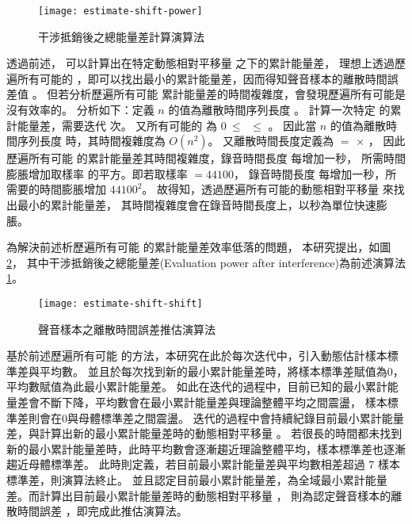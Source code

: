 \begin{figure}[H]
    \centering
    \texttt{[image: estimate-shift-power]}
    \caption{干涉抵銷後之總能量差計算演算法}\label{fig:estimate-power}
\end{figure}

    透過前述，
可以計算出在特定動態相對平移量 \DEFcandiSFT 之下的累計能量差，
理想上透過歷遍所有可能的 \DEFcandiSFT，即可以找出最小的累計能量差，因而得知聲音樣本的離散時間誤差值 \DEFshift。
但若分析歷遍所有可能 \DEFcandiSFT 累計能量差的時間複雜度，會發現歷遍所有可能是沒有效率的。
分析如下：定義 $n$ 的值為離散時間序列長度 \DEFtimeLen。
計算一次特定 \DEFcandiSFT 的累計能量差，需要迭代 \DEFtimeLen 次。
又所有可能的 \DEFcandiSFT 為 $0 ~\leq$ \DEFcandiSFT $~\leq$ \DEFtimeLen。
因此當 $n$ 的值為離散時間序列長度 \DEFtimeLen 時，其時間複雜度為 $O(n^2)$。
又離散時間長度定義為 \DEFtimeLen $=$ \DEFsamplerate $\times$ \DEFtimeREC，
因此歷遍所有可能 \DEFcandiSFT 的累計能量差其時間複雜度，錄音時間長度 \DEFtimeREC 每增加一秒，
所需時間膨脹增加取樣率 \DEFsamplerate 的平方。即若取樣率 \DEFsamplerate $= 44100$，
錄音時間長度 \DEFtimeREC 每增加一秒，所需要的時間膨脹增加 $44100^2$。
故得知，透過歷遍所有可能的動態相對平移量 \DEFcandiSFT 來找出最小的累計能量差，
其時間複雜度會在錄音時間長度上，以秒為單位快速膨脹。

    為解決前述析歷遍所有可能 \DEFcandiSFT 的累計能量差效率低落的問題，
本研究提出，如圖\ref{fig:estimate-shift}，
其中干涉抵銷後之總能量差(Evaluation power after interference)為前述演算法\ref{fig:estimate-power}。

\begin{figure}[H]
    \centering
    \texttt{[image: estimate-shift-shift]}
    \caption{聲音樣本之離散時間誤差推估演算法}\label{fig:estimate-shift}
\end{figure}

    基於前述歷遍所有可能 \DEFcandiSFT 的方法，本研究在此於每次迭代中，引入動態估計樣本標準差與平均數。
並且於每次找到新的最小累計能量差時，將樣本標準差賦值為$0$，平均數賦值為此最小累計能量差。
如此在迭代的過程中，目前已知的最小累計能量差會不斷下降，平均數會在最小累計能量差與理論整體平均之間震盪，
樣本標準差則會在$0$與母體標準差之間震盪。
迭代的過程中會持續紀錄目前最小累計能量差，與計算出新的最小累計能量差時的動態相對平移量 \DEFcandiSFT。
若很長的時間都未找到新的最小累計能量差時，此時平均數會逐漸趨近理論整體平均，樣本標準差也逐漸趨近母體標準差。
此時則定義，若目前最小累計能量差與平均數相差超過 $7$ 樣本標準差，則演算法終止。
並且認定目前最小累計能量差，為全域最小累計能量差。而計算出目前最小累計能量差時的動態相對平移量 \DEFcandiSFT，
則為認定聲音樣本的離散時間誤差 \DEFshift，即完成此推估演算法。